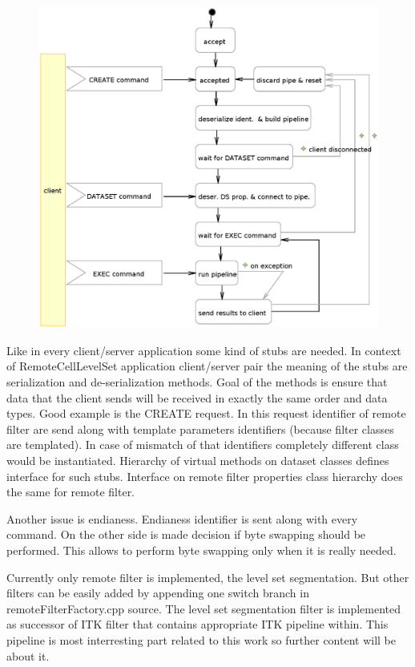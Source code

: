\begin{figure}
    \centering
    \includegraphics[width=12cm]{data/RCServerCycle}
    \caption[MedV4D server cycle]{}
    \label{fg:RCServerCycle}
\end{figure}

Like in every client/server application some kind of stubs are needed.
In context of RemoteCellLevelSet application client/server pair the meaning of the stubs are serialization and de-serialization methods.
Goal of the methods is ensure that data that the client sends will be received in exactly the same order and data types.
Good example is the CREATE request.
In this request identifier of remote filter are send along with template parameters identifiers (because filter classes are templated).
In case of mismatch of that identifiers completely different class would be instantiated.
Hierarchy of virtual methods on dataset classes defines interface for such stubs.
Interface on remote filter properties class hierarchy does the same for remote filter.

Another issue is endianess.
Endianess identifier is sent along with every command. On the other side is made decision if byte swapping should be performed.
This allows to perform byte swapping only when it is really needed.

Currently only remote filter is implemented, the level set segmentation.
But other filters can be easily added by appending one switch branch in remoteFilterFactory.cpp source.
The level set segmentation filter is implemented as successor of ITK filter that contains appropriate ITK pipeline within.
This pipeline is most interresting part related to this work so further content will be about it.


